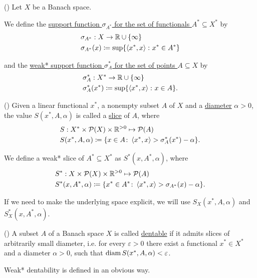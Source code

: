 \begin{definition}(\cite[Example 3.2(a)]{Phelps1993})
  \label{def:banach_support_function}
  Let $X$ be a Banach space.

  We define the \uline{support function $\sigma_{A^*}$ for the set of functionals $A^* \subseteq X^*$} by
  \begin{align*}
    &\sigma_{A^*}: X \to \mathbb R \cup \{ \infty \} \\
    &\sigma_{A^*}(x) \coloneqq \sup \{ \left\langle x^*, x \right\rangle \colon x^* \in A^* \}
  \end{align*}

  and the \uline{weak* support function $\sigma^*_A$ for the set of points $A \subseteq X$} by
  \begin{align*}
    &\sigma^*_A: X^* \to \mathbb R \cup \{ \infty \} \\
    &\sigma^*_A(x^*) \coloneqq \sup \{ \left\langle x^*, x \right\rangle \colon x \in A \}.
  \end{align*}
\end{definition}

\begin{definition}(\cite[definition 2.17]{Phelps1993})
  \label{def:banach_slice}
  Given a linear functional $x^*$, a nonempty subset $A$ of $X$ and a \uline{diameter} $\alpha > 0$, the value $S(x^*, A, \alpha)$ is called a \uline{slice} of $A$, where
  \begin{align*}
    &S: X^* \times \operatorname{\mathcal{P}}(X) \times \mathbb R^{>0} \mapsto \operatorname{\mathcal{P}}(A) \\
    &S(x^*, A, \alpha) \coloneqq \{ x \in A \colon \left\langle x^*, x \right\rangle > \sigma_A^*(x^*) - \alpha \}.
  \end{align*}

  We define a weak* slice of $A^* \subseteq X^*$ as $S^*(x, A^*, \alpha)$, where
  \begin{align*}
    &S^*: X \times \operatorname{\mathcal{P}}(X) \times \mathbb R^{>0} \mapsto \operatorname{\mathcal{P}}(A) \\
    &S^*(x, A^*, \alpha) \coloneqq \{ x^* \in A^* \colon \left\langle x^*, x \right\rangle > \sigma_{A^*}(x) - \alpha \}.
  \end{align*}

  If we need to make the underlying space explicit, we will use $S_X(x^*, A, \alpha)$ and $S_X^*(x, A^*, \alpha)$.
\end{definition}

\begin{definition}(\cite[definition 5.1]{Phelps1993})
  \label{def:dentability}
  A subset $A$ of a Banach space $X$ is called \uline{dentable} if it admits slices of arbitrarily small diameter, i.e. for every $\varepsilon > 0$ there exist a functional $x^* \in X^*$ and a diameter $\alpha > 0$, such that $\operatorname{diam} S(x^*, A, \alpha) < \varepsilon$.

  Weak* dentability is defined in an obvious way.
\end{definition}

